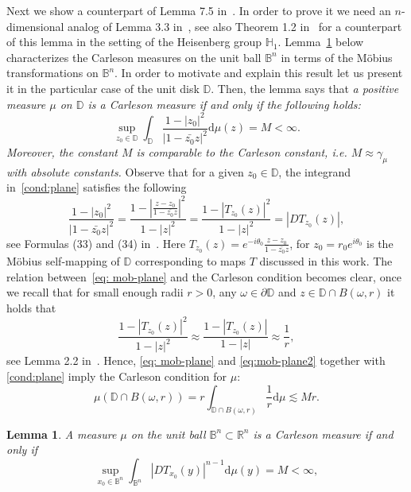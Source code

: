 \documentclass[11pt,a4paper,reqno]{amsart}
\newtheorem{lem}[theorem]{Lemma}
\theoremstyle{definition}
\newcommand{\om}{\omega}
\newcommand{\B}{\mathbb{B}^n}
\newcommand{\Rn}{{\mathbb R}^n}
\newcommand{\ud}{\mathrm {d}}
\numberwithin{komcounter}{section}
\begin{document}
Next we show a counterpart of Lemma 7.5 in~\cite{ak}. In order to prove it we need an $n$-dimensional analog of Lemma 3.3 in~\cite[Ch VI]{g}, see also Theorem 1.2 in~\cite{adgr} for a counterpart of this lemma in the setting of the Heisenberg group $\mathbb{H}_1$. Lemma~\ref{lem-gar33} below characterizes the Carleson measures on the unit ball $\B$ in terms of the M\"obius transformations on $\B$. In order to motivate and explain this result let us present it in the particular case of the unit disk $\mathbb{D}$. Then, the lemma says that \emph{a positive measure $\mu$ on $\mathbb{D}$ is a Carleson measure if and only if the following holds:
\begin{equation}\label{cond:plane}
 \sup_{z_0\in \mathbb{D}} \int_{\mathbb{D}} \frac{1-|z_0|^2}{|1-\bar{z_0}z|^2} \ud \mu(z)=M<\infty.
\end{equation}
Moreover, the constant $M$ is comparable to the Carleson constant, i.e. $M\approx \gamma_{\mu}$ with absolute constants.
}
Observe that for a given $z_0\in \mathbb{D}$, the integrand in~\eqref{cond:plane} satisfies the following
\begin{equation}\label{eq: mob-plane}
\frac{1-|z_0|^2}{|1-\bar{z_0}z|^2}=\frac{1-\left|\frac{z-z_0}{1-\bar{z_0}z}\right|^2}{1-|z|^2}=\frac{1-|T_{z_0}(z)|^2}{1-|z|^2}=|D T_{z_0}(z)|,
\end{equation}
see Formulas (33) and (34) in~\cite[Ch II]{ahl}. Here $T_{z_0}(z)=e^{-i\theta_0}\frac{z-z_0}{1-\bar{z_0}z}$, for $z_0=r_0 e^{i\theta_0}$ is the M\"obius self-mapping of $\mathbb{D}$ corresponding to maps $T$ discussed in this work.  The relation between~\eqref{eq: mob-plane} and the Carleson condition becomes clear, once we recall that for small enough radii $r>0$, any $\om\in \partial \mathbb{D}$ and $z\in \mathbb{D} \cap B(\om,r)$ it holds that 
\begin{equation}\label{eq:mob-plane2}
\frac{1-|T_{z_0}(z)|^2}{1-|z|^2} \approx \frac{1-|T_{z_0}(z)|}{1-|z|}\approx \frac{1}{r},
\end{equation}
see Lemma 2.2 in~\cite{ag2}. Hence, \eqref{eq: mob-plane} and \eqref{eq:mob-plane2} together with \eqref{cond:plane} imply the Carleson condition for $\mu$:
$$
\mu(\mathbb{D} \cap B(\om,r)) = r \int_{\mathbb{D} \cap B(\om,r)} \frac{1}{r} \ud \mu\lesssim Mr.
$$

\begin{lem}\label{lem-gar33} A measure $\mu$ on the unit ball $\B\subset \Rn$ is a Carleson measure if and only if
 \begin{equation*}%
  \sup_{x_0\in \B} \int_{\B} |D T_{x_0}(y)|^{n-1} \ud \mu(y)=M<\infty,
 \end{equation*}
\end{lem}
\end{document}
